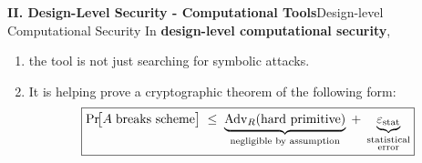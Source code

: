 \documentclass[10pt,aspectratio=1610,compress,dvipsnames]{beamer}
\begin{document}
\begin{frame}[fragile]{\bfseries II. Design-Level Security - Computational Tools}{Design-level Computational Security}
In \textbf{design-level computational security}, \begin{enumerate}[$\bullet$]
	\item the tool is not just searching for symbolic attacks. 
	\item It is helping prove a cryptographic theorem of the following form: \[
	\boxed{\Pr\!\bigl[A\;\text{breaks scheme}\bigr]
	\;\leq\;
	\underbrace{%
		\mathrm{Adv}_{R}(\text{hard primitive})%
	}_{\text{negligible by assumption}}
	\;+\;
	\underbrace{%
		\varepsilon_{\mathrm{stat}}%
	}_{\substack{\text{statistical}\\\text{error}}}}
	\]
\end{enumerate}
\end{frame}
\end{document}
